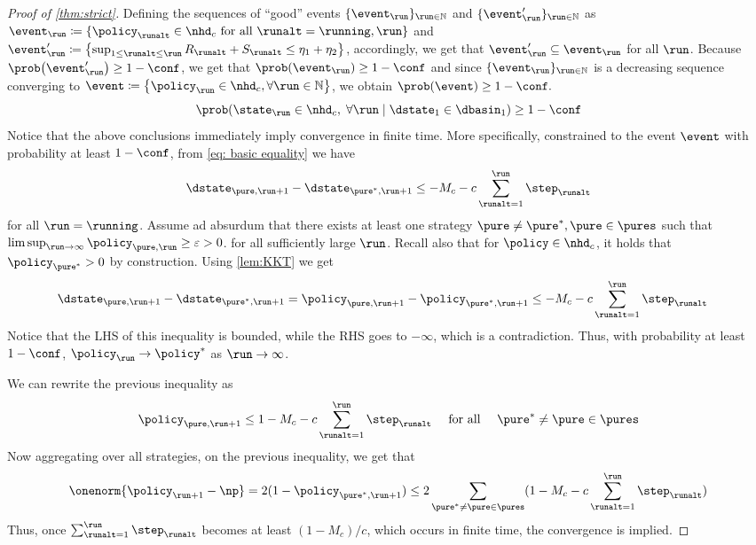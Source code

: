 \begin{proof}[Proof of \cref{thm:strict}]
 Defining the sequences of ``good'' events $\{\event_\run\}_{\run \in \N}$ and $\{\event'_\run\}_{\run \in \N}$ as $\event_\run \defeq \braces{\policy_\runalt \in \nhd_c \text{ for all }  \runalt=\running,\run}$ and $\event'_\run \defeq \braces*{\sup_{1 \leq \runalt \leq \run} R_{\runalt}+S_{\runalt} \leq \eta_1 + \eta_2}$, accordingly, we get that $\event'_\run \subseteq \event_\run$ for all $\run$. Because $\prob\parens*{\event'_\run} \geq 1-\conf$, we get that
\(
\prob\parens*{\event_{\run}} \geq 1-\conf
\)
and since $\{\event_\run\}_{\run \in \N}$ is a decreasing sequence converging to $\event \defeq \braces*{\policy_\run \in \nhd_c, \forall \run \in \N}$, we obtain
\(
\prob\parens*{\event} \geq 1-\conf.
\)
\ie
\begin{equation}
\prob\parens*{\curr \in \nhd_c, \; \forall \run \mid \dstate_{1} \in \dbasin_{1}} \geq 1-\conf
\end{equation}
Notice that the above conclusions immediately imply convergence in finite time. More specifically, constrained to the event $\event$ with probability at least $1-\conf$, from \cref{eq: basic equality} we have 
\begin{align}
    \dstate_{\pure,\run +1} -\dstate_{\pure^*,\run+1} \leq 
-M_c -c\sum_{\runalt=1}^{\run}\step_{\runalt} 
\end{align}
for all $\run=\running$.  Assume ad absurdum  that there exists at least one strategy $\pure\neq\pure^*,\pure\in\pures$ such that $\limsup_{\run\to\infty}\policy_{\pure,\run} \geq \eps >0$.
for all sufficiently large $\run$. Recall also that for $\policy\in \nhd_c$, it holds that $\policy_{\pure^*}>0$ by construction.
Using \cref{lem:KKT} we get
\begin{align}
   \dstate_{\pure,\run +1} -\dstate_{\pure^*,\run+1}=  \policy_{\pure,\run+1} - \policy_{\pure^*,\run+1}  &\leq -M_c -c\sum_{\runalt=1}^{\run}\step_{\runalt}
\end{align}
Notice that the \acs{LHS} of this inequality is bounded, while the \acs{RHS} goes to $-\infty$, which is a contradiction. Thus, with probability at least $1-\conf$, $\policy_{\run}\to\policy^*$ as $\run\to\infty$.

We can rewrite the previous inequality as
\begin{equation}
    \policy_{\pure,\run+1} \leq 1 -M_c -c\sum_{\runalt=1}^{\run}\step_{\runalt} \quad\text{ for all }\quad\pure^*\neq\pure\in\pures
\end{equation}
Now aggregating over all strategies, on the previous inequality,  we get that 
\begin{align}
    \onenorm{\policy_{\run+1} -\np} = 2(1-\policy_{\pure^*,\run+1}) \leq2 \sum_{\pure^*\neq\pure\in\pures}(1- M_c -c\sum_{\runalt=1}^{\run}\step_{\runalt} )
\end{align}
Thus, once $\sum_{\runalt=1}^{\run}\step_{\runalt}$  becomes at least $(1-M_c)/c$, which occurs in finite time, the convergence is implied.
\end{proof}



